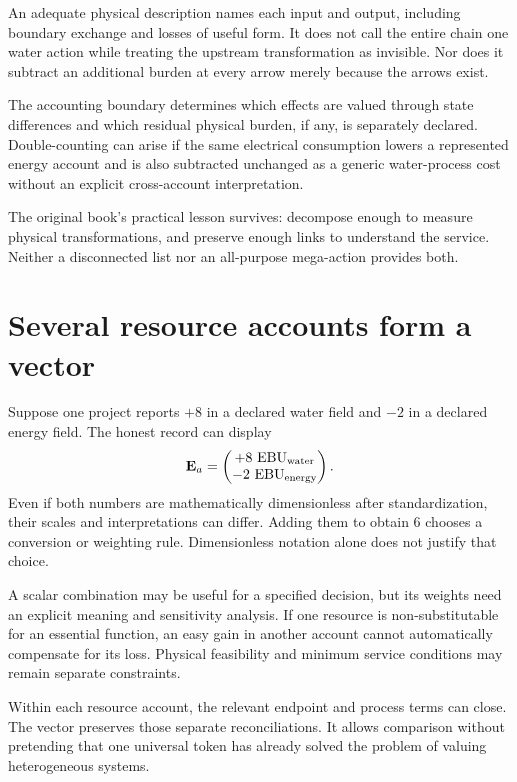 An adequate physical description names each input and output, including boundary exchange and losses of useful form. It does not call the entire chain one water action while treating the upstream transformation as invisible. Nor does it subtract an additional burden at every arrow merely because the arrows exist.

The accounting boundary determines which effects are valued through state differences and which residual physical burden, if any, is separately declared. Double-counting can arise if the same electrical consumption lowers a represented energy account and is also subtracted unchanged as a generic water-process cost without an explicit cross-account interpretation.

The original book's practical lesson survives: decompose enough to measure physical transformations, and preserve enough links to understand the service. Neither a disconnected list nor an all-purpose mega-action provides both.

\section{Several resource accounts form a vector}
Suppose one project reports $+8$ in a declared water field and $-2$ in a declared energy field. The honest record can display
\begin{equation}
 \mathbf E_a=\begin{pmatrix}+8\ \mathrm{EBU}_{\rm water}\\-2\ \mathrm{EBU}_{\rm energy}\end{pmatrix}.
\end{equation}
Even if both numbers are mathematically dimensionless after standardization, their scales and interpretations can differ. Adding them to obtain 6 chooses a conversion or weighting rule. Dimensionless notation alone does not justify that choice.

A scalar combination may be useful for a specified decision, but its weights need an explicit meaning and sensitivity analysis. If one resource is non-substitutable for an essential function, an easy gain in another account cannot automatically compensate for its loss. Physical feasibility and minimum service conditions may remain separate constraints.

Within each resource account, the relevant endpoint and process terms can close. The vector preserves those separate reconciliations. It allows comparison without pretending that one universal token has already solved the problem of valuing heterogeneous systems.

